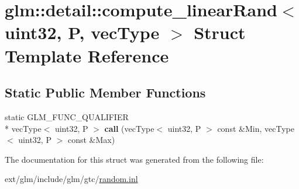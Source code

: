 \hypertarget{structglm_1_1detail_1_1compute__linear_rand_3_01uint32_00_01_p_00_01vec_type_01_4}{\section{glm\-:\-:detail\-:\-:compute\-\_\-linear\-Rand$<$ uint32, P, vec\-Type $>$ Struct Template Reference}
\label{structglm_1_1detail_1_1compute__linear_rand_3_01uint32_00_01_p_00_01vec_type_01_4}
}
\subsection*{Static Public Member Functions}
\begin{DoxyCompactItemize}
\item 
\hypertarget{structglm_1_1detail_1_1compute__linear_rand_3_01uint32_00_01_p_00_01vec_type_01_4_a94f867cad88b72c723b91fb0f8e7e866}{static G\-L\-M\-\_\-\-F\-U\-N\-C\-\_\-\-Q\-U\-A\-L\-I\-F\-I\-E\-R \\*
vec\-Type$<$ uint32, P $>$ {\bfseries call} (vec\-Type$<$ uint32, P $>$ const \&Min, vec\-Type$<$ uint32, P $>$ const \&Max)}\label{structglm_1_1detail_1_1compute__linear_rand_3_01uint32_00_01_p_00_01vec_type_01_4_a94f867cad88b72c723b91fb0f8e7e866}

\end{DoxyCompactItemize}


The documentation for this struct was generated from the following file\-:\begin{DoxyCompactItemize}
\item 
ext/glm/include/glm/gtc/\hyperlink{random_8inl}{random.\-inl}\end{DoxyCompactItemize}
